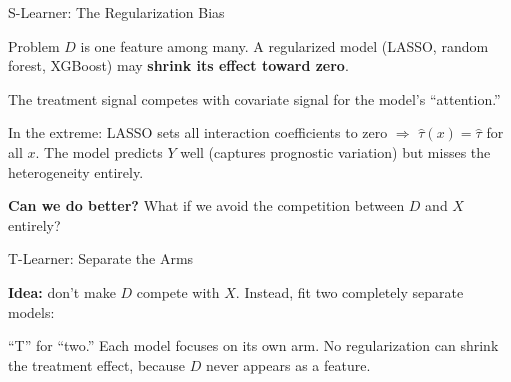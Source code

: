 \documentclass[aspectratio=169, 11pt]{beamer}
\begin{document}
\begin{frame}{S-Learner: The Regularization Bias}
 
\begin{alertblock}{Problem}
$D$ is one feature among many. A regularized model (LASSO, random forest, XGBoost) may \textbf{shrink its effect toward zero}.
\end{alertblock}
 
\bigskip
 
The treatment signal competes with covariate signal for the model's ``attention.''
 
\bigskip
 
In the extreme: LASSO sets all interaction coefficients to zero $\Rightarrow$ $\hat{\tau}(x) = \hat{\tau}$ for all $x$. The model predicts $Y$ well (captures prognostic variation) but misses the heterogeneity entirely.
 
\bigskip
\pause
 
\textbf{Can we do better?} What if we avoid the competition between $D$ and $X$ entirely?
\end{frame}
 
\begin{frame}{T-Learner: Separate the Arms}
 
\textbf{Idea:} don't make $D$ compete with $X$. Instead, fit two completely separate models:
 
\begin{center}
\end{center}
 
\bigskip
 
``T'' for ``two.'' Each model focuses on its own arm. No regularization can shrink the treatment effect, because $D$ never appears as a feature.
\end{frame}
 
\end{document}
